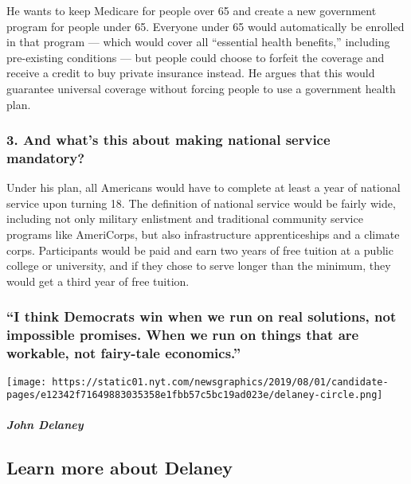 He wants to keep Medicare for people over 65 and create a new government
program for people under 65. Everyone under 65 would automatically be
enrolled in that program --- which would cover all ``essential health
benefits,'' including pre-existing conditions --- but people could
choose to forfeit the coverage and receive a credit to buy private
insurance instead. He argues that this would guarantee universal
coverage without forcing people to use a government health plan.

\hypertarget{3-and-whats-this-about-making-national-service-mandatory}{%
\subsubsection{\texorpdfstring{\textbf{3. And what's this about making
national service
mandatory?}}{3. And what's this about making national service mandatory?}}\label{3-and-whats-this-about-making-national-service-mandatory}}

Under his plan, all Americans would have to complete at least a year of
national service upon turning 18. The definition of national service
would be fairly wide, including not only military enlistment and
traditional community service programs like AmeriCorps, but also
infrastructure apprenticeships and a climate corps. Participants would
be paid and earn two years of free tuition at a public college or
university, and if they chose to serve longer than the minimum, they
would get a third year of free tuition.

\hypertarget{i-think-democrats-win-when-we-run-on-real-solutions-not-impossible-promises-when-we-run-on-things-that-are-workable-not-fairy-tale-economics}{%
\subsubsection{``I think Democrats win when we run on real solutions,
not impossible promises. When we run on things that are workable, not
fairy-tale
economics.''}\label{i-think-democrats-win-when-we-run-on-real-solutions-not-impossible-promises-when-we-run-on-things-that-are-workable-not-fairy-tale-economics}}

\texttt{[image: https://static01.nyt.com/newsgraphics/2019/08/01/candidate-pages/e12342f71649883035358e1fbb57c5bc19ad023e/delaney-circle.png]}

\hypertarget{john-delaney-1}{%
\subparagraph{John Delaney}\label{john-delaney-1}}

\hypertarget{learn-more-about-delaney}{%
\subsection{Learn more about Delaney}\label{learn-more-about-delaney}}

